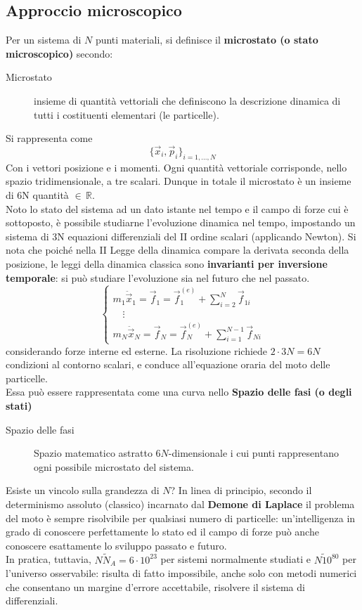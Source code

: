 \documentclass[10pt, oneside]{book}
\begin{document}
\subsection{Approccio microscopico}
Per un sistema di $N$ punti materiali, si definisce il \textbf{microstato (o stato microscopico)} secondo:
\begin{description}
\item[Microstato] insieme di quantità vettoriali che definiscono la descrizione dinamica di tutti i costituenti elementari (le particelle).
\end{description}
Si rappresenta come
\[\{\vec{x}_i, \vec{p}_i\}_{i = 1, ..., N}\]
Con i vettori posizione e i momenti. Ogni quantità vettoriale corrisponde, nello spazio tridimensionale, a tre scalari. Dunque in totale il microstato è un insieme di 6N quantità $\displaystyle \in \, \mathbb{R}$.
\\Noto lo stato del sistema ad un dato istante nel tempo e il campo di forze cui è sottoposto, è possibile studiarne l'evoluzione dinamica nel tempo, impostando un sistema di 3N equazioni differenziali del II ordine scalari (applicando Newton). Si nota che poiché nella II Legge della dinamica compare la derivata seconda della posizione, le leggi della dinamica classica sono \textbf{invarianti per inversione temporale}: si può studiare l'evoluzione sia nel futuro che nel passato.
\[\begin{cases}
m_1 \ddot{ \vec{x}}_1 = \vec{f}_1 = \vec{f}_1^{(e)} + \sum\limits_{i=2}^N \vec{f}_{1i}\\
\quad \vdots\\
m_N \ddot{ \vec{x}}_N = \vec{f}_N = \vec{f}_N^{(e)} + \sum\limits_{i=1}^{N-1} \vec{f}_{Ni}
\end{cases}\]
considerando forze interne ed esterne. La risoluzione richiede $2 \cdot 3N = 6N$ condizioni al contorno scalari, e conduce all'equazione oraria del moto delle particelle.
\\Essa può essere rappresentata come una curva nello \textbf{Spazio delle fasi (o degli stati)}
\begin{description}
\item[Spazio delle fasi] Spazio matematico astratto $6N$-dimensionale i cui punti rappresentano ogni possibile microstato del sistema.
\end{description}
Esiste un vincolo sulla grandezza di $N$? In linea di principio, secondo il determinismo assoluto (classico) incarnato dal \textbf{Demone di Laplace} il problema del moto è sempre risolvibile per qualsiasi numero di particelle: un'intelligenza in grado di conoscere perfettamente lo stato ed il campo di forze può anche conoscere esattamente lo sviluppo passato e futuro.
\\In pratica, tuttavia, $N \tilde N_A = 6 \cdot 10^{23}$ per sistemi normalmente studiati e $N \tilde 10^{80}$ per l'universo osservabile: risulta di fatto impossibile, anche solo con metodi numerici che consentano un margine d'errore accettabile, risolvere il sistema di differenziali.
\end{document}
